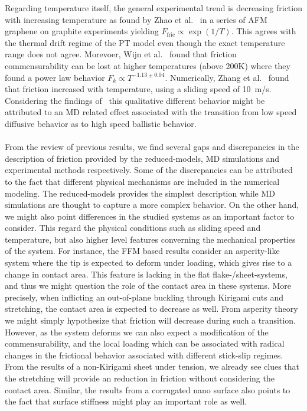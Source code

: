 Regarding temperature itself, the general experimental trend is decreasing friction with increasing temperature as found by Zhao et al.~\cite{zhao_thermally_2007} in a series of \acrshort{AFM} graphene on graphite experiments yielding $F_{\text{fric}} \propto \exp{(1/T)}$. This agrees with the thermal drift regime of the \acrshort{PT} model even though the exact temperature range does not agree. Morevoer, Wijn et al.~\cite{Wijn_2011} found that friction commensurability can be lost at higher temperatures (above 200K) where they found a power law behavior $F_k \propto T^{-1.13 \pm0.04}$. Numerically, Zhang et al.~\cite{ma12091425} found that friction increased with temperature, using a sliding speed of \SI{10}{m/s}. Considering the findings of~\cite{Guerra_2010} this qualitative different behavior might be attributed to an \acrshort{MD} related effect associated with the transition from low speed diffusive behavior as to high speed ballistic behavior.
\\
\\
From the review of previous results, we find several gaps and discrepancies in
the description of friction provided by the reduced-models, \acrshort{MD}
simulations and experimental methods respectively. Some of the discrepancies can
be attributed to the fact that different physical mechanisms are included in the
numerical modeling. The reduced-models provides the simplest description while
\acrshort{MD} simulations are thought to capture a more complex behavior. On the
other hand, we might also point differences in the studied systems as an
important factor to consider. This regard the physical conditions such as
sliding speed and temperature, but also higher level features converning the
mechanical properties of the system. For instance, the \acrshort{FFM} based
results consider an asperity-like system where the tip is expected to deform
under loading, which gives rise to a change in contact area. This feature is
lacking in the flat flake-/sheet-systems, and thus we might question the role of
the contact area in these systems. More precisely, when inflicting an
out-of-plane buckling through Kirigami cuts and stretching, the contact area is
expected to decrease as well. From asperity theory we might simply hypothesize
that friction will decrease during such a transition. However, as the system
deforms we can also expect a modification of the commensurability, and the local loading which can be associated with radical changes in the frictional behavior associated with different stick-slip regimes. From the results of a non-Kirigami sheet under tension, we already see clues that the stretching will provide an reduction in friction without considering the contact area. Similar, the results from a corrugated nano surface also points to the fact that surface stiffness might play an important role as well. 








